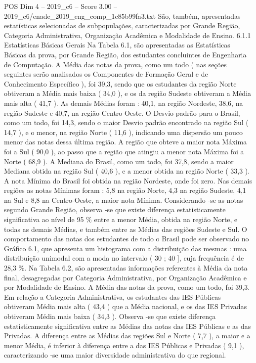 \begin{textsample}{POS Dim 4 – 2019\_c6 – Score 3.00 – 2019\_c6/enade\_2019\_eng\_comp\_1c85b99fa3.txt}
São, também, apresentadas estatísticas selecionadas de subpopulações, caracterizadas por Grande Região, Categoria Administrativa, Organização Acadêmica e Modalidade de Ensino. 6.1.1 Estatísticas Básicas Gerais Na Tabela 6.1, são apresentadas as Estatísticas Básicas da prova, por Grande Região, dos estudantes concluintes de Engenharia de Computação.
A Média das notas da prova, como um todo ( nas seções seguintes serão analisados os Componentes de Formação Geral e de Conhecimento Específico ), foi 39,3, sendo que os estudantes da região Norte obtiveram a Média mais baixa ( 34,0 ), e os da região Sudeste obtiveram a Média mais alta ( 41,7 ).
As demais Médias foram : 40,1, na região Nordeste, 38,6, na região Sudeste e 40,7, na região Centro-Oeste.
O Desvio padrão para o Brasil, como um todo, foi 14,3, sendo o maior Desvio padrão encontrado na região Sul ( 14,7 ), e o menor, na região Norte ( 11,6 ), indicando uma dispersão um pouco menor das notas dessa última região.
A região que obteve a maior nota Máxima foi a Sul ( 90,0 ), ao passo que a região que atingiu a menor nota Máxima foi a Norte ( 68,9 ).
A Mediana do Brasil, como um todo, foi 37,8, sendo a maior Mediana obtida na região Sul ( 40,6 ), e a menor obtida na região Norte ( 33,3 ).
A nota Mínima do Brasil foi obtida na região Nordeste, onde foi zero.
Nas demais regiões as notas Mínimas foram : 5,8 na região Norte, 4,3 na região Sudeste, 4,1 na Sul e 8,8 na Centro-Oeste, a maior nota Mínima.
Considerando -se as notas segundo Grande Região, observa -se que existe diferença estatisticamente significativa ao nível de 95 \% entre a menor Média, obtida na região Norte, e todas as demais Médias, e também entre as Médias das regiões Sudeste e Sul.
O comportamento das notas dos estudantes de todo o Brasil pode ser observado no Gráfico 6.1, que apresenta um histograma com a distribuição das mesmas : uma distribuição unimodal com a moda no intervalo ( 30 ; 40 ], cuja frequência é de 28,3 \%.
Na Tabela 6.2, são apresentadas informações referentes à Média da nota final, desagregadas por Categoria Administrativa, por Organização Acadêmica e por Modalidade de Ensino.
A Média das notas da prova, como um todo, foi 39,3.
Em relação a Categoria Administrativa, os estudantes das IES Públicas obtiveram Média mais alta ( 43,4 ) que a Média nacional, e os das IES Privadas obtiveram Média mais baixa ( 34,3 ).
Observa -se que existe diferença estatisticamente significativa entre as Médias das notas das IES Públicas e as das Privadas.
A diferença entre as Médias das regiões Sul e Norte ( 7,7 ), a maior e a menor Média, é inferior à diferença entre a das IES Públicas e Privadas ( 9,1 ), caracterizando -se uma maior diversidade administrativa do que regional.

\end{textsample}
